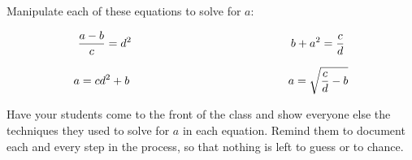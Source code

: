 

Manipulate each of these equations to solve for $a$:

$${{a - b} \over c} = d^2 \hbox{\hskip 140pt} b + a^2 = {c \over d}$$







$$a = cd^2 + b \hbox{\hskip 140pt} a = \sqrt{{c \over d} - b}$$







Have your students come to the front of the class and show everyone else the techniques they used to solve for $a$ in each equation.  Remind them to document each and every step in the process, so that nothing is left to guess or to chance.





